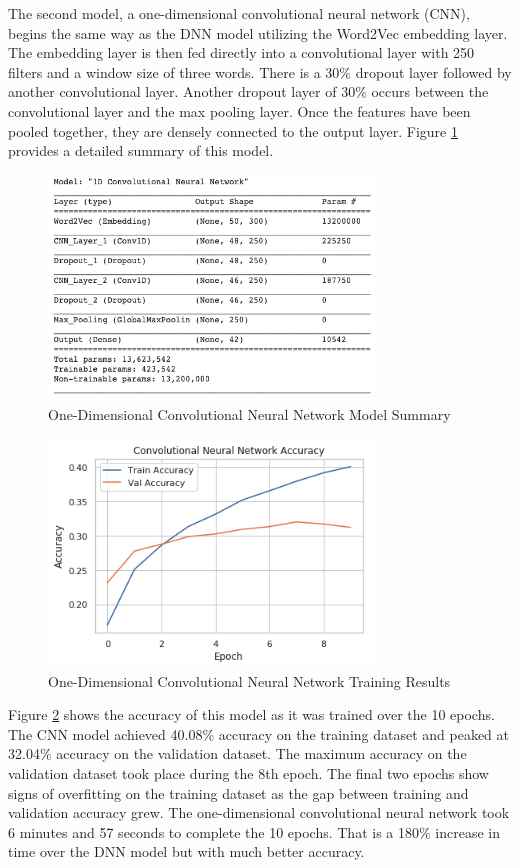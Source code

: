 \documentclass[5p,authoryear]{elsarticle}
\begin{document}
The second model, a one-dimensional convolutional neural network (CNN), begins the same way as the DNN model utilizing the Word2Vec embedding layer. The embedding layer is then fed directly into a convolutional layer with 250 filters and a window size of three words. There is a 30\% dropout layer followed by another convolutional layer. Another dropout layer of 30\% occurs between the convolutional layer and the max pooling layer. Once the features have been pooled together, they are densely connected to the output layer. Figure \ref{CNN Summary} provides a detailed summary of this model.


\begin{figure}[!htb] \centering
	\includegraphics[width=3.4in]{figures/CNN_Model.png}
	\caption[]{One-Dimensional Convolutional Neural Network Model Summary} 
	\label{CNN Summary} 
\end{figure}


\begin{figure}[!htb] \centering
	\includegraphics[width=3.4in]{figures/CNN_Accuracy.png}
	\caption[]{One-Dimensional Convolutional Neural Network Training Results} 
	\label{CNN Results} 
\end{figure}


Figure \ref{CNN Results} shows the accuracy of this model as it was trained over the 10 epochs. The CNN model achieved 40.08\% accuracy on the training dataset and peaked at 32.04\% accuracy on the validation dataset. The maximum accuracy on the validation dataset took place during the 8th epoch. The final two epochs show signs of overfitting on the training dataset as the gap between training and validation accuracy grew. The one-dimensional convolutional neural network took 6 minutes and 57 seconds to complete the 10 epochs. That is a 180\% increase in time over the DNN model but with much better accuracy. 
\end{document}
